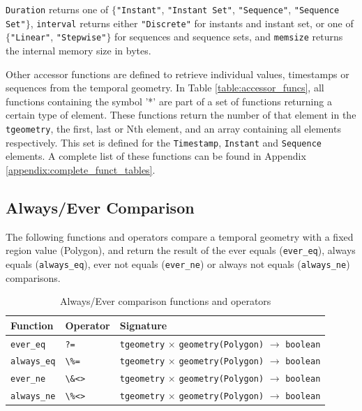 \lstinline{Duration} returns one of $\{$\lstinline{"Instant"}, \lstinline{"Instant Set"}, \lstinline{"Sequence"}, \lstinline{"Sequence Set"}$\}$, \lstinline{interval} returns either \lstinline{"Discrete"} for instants and instant set, or one of $\{$\lstinline{"Linear"}, \lstinline{"Stepwise"}$\}$ for sequences and sequence sets, and \lstinline{memsize} returns the internal memory size in bytes.

Other accessor functions are defined to retrieve individual values, timestamps or sequences from the temporal geometry. In Table \ref{table:accessor_funcs}, all functions containing the symbol '*' are part of a set of functions returning a certain type of element. These functions return the number of that element in the \lstinline+tgeometry+, the first, last or Nth element, and an array containing all elements respectively. This set is defined for the \lstinline{Timestamp}, \lstinline{Instant} and \lstinline{Sequence} elements. A complete list of these functions can be found in Appendix \ref{appendix:complete_funct_tables}.

\subsection{Always/Ever Comparison}
\label{section:always_ever}

The following functions and operators compare a temporal geometry with a fixed region value (Polygon), and return the result of the ever equals (\lstinline+ever_eq+), always equals (\lstinline+always_eq+), ever not equals (\lstinline+ever_ne+) or always not equals (\lstinline+always_ne+) comparisons. \\

\begin{table}[htb]
    \centering
    \begin{tabularx}{\textwidth}{|l|l|X|}
    \hline
    \textbf{Function}   & \textbf{Operator} & \textbf{Signature} \\
    \hline
    \lstinline+ever_eq+    & \lstinline+?=+      & \lstinline+tgeometry+ $\times$ \lstinline+geometry(Polygon)+ $\rightarrow$ \lstinline+boolean+ \\
    \hline
    \lstinline+always_eq+  & \lstinline+\%=+     & \lstinline+tgeometry+ $\times$ \lstinline+geometry(Polygon)+ $\rightarrow$ \lstinline+boolean+ \\
    \hline
    \lstinline+ever_ne+    & \lstinline+\&<>+    & \lstinline+tgeometry+ $\times$ \lstinline+geometry(Polygon)+ $\rightarrow$ \lstinline+boolean+ \\
    \hline
    \lstinline+always_ne+  & \lstinline+\%<>+    & \lstinline+tgeometry+ $\times$ \lstinline+geometry(Polygon)+ $\rightarrow$ \lstinline+boolean+ \\
    \hline
    \end{tabularx}
    \caption{Always/Ever comparison functions and operators}
    \label{table:always_ever_funcs}
\end{table}

